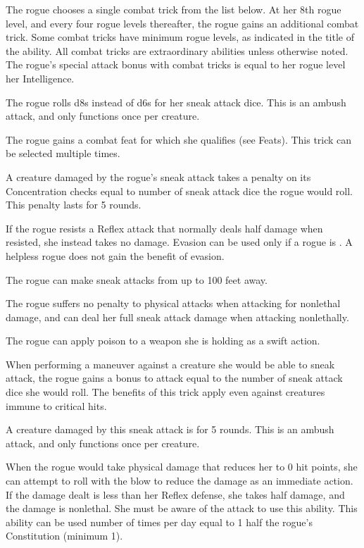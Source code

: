 The rogue chooses a single combat trick from the list below. At her 8th rogue level, and every four rogue levels thereafter, the rogue gains an additional combat trick. Some combat tricks have minimum rogue levels, as indicated in the title of the ability. All combat tricks are extraordinary abilities unless otherwise noted. The rogue's special attack bonus with combat tricks is equal to her rogue level \add her Intelligence.

 The rogue rolls d8s instead of d6s for her sneak attack dice. This is an ambush attack, and only functions once per creature.

 The rogue gains a combat feat for which she qualifies (see Feats). This trick can be selected multiple times.

 A creature damaged by the rogue's sneak attack takes a penalty on its Concentration checks equal to number of sneak attack dice the rogue would roll. This penalty lasts for 5 rounds.

 If the rogue resists a Reflex attack that normally deals half damage when resisted, she instead takes no damage. Evasion can be used only if a rogue is \unencumbered. A helpless rogue does not gain the benefit of evasion.

 The rogue can make sneak attacks from up to 100 feet away.

 The rogue suffers no penalty to physical attacks when attacking for nonlethal damage, and can deal her full sneak attack damage when attacking nonlethally.

 The rogue can apply poison to a weapon she is holding as a swift action.

 When performing a maneuver against a creature she would be able to sneak attack, the rogue gains a bonus to attack equal to the number of sneak attack dice she would roll. The benefits of this trick apply even against creatures immune to critical hits.

 A creature damaged by this sneak attack is \bewildered for 5 rounds. This is an ambush attack, and only functions once per creature.

 When the rogue would take physical damage that reduces her to 0 hit points, she can attempt to roll with the blow to reduce the damage as an immediate action. If the damage dealt is less than her Reflex defense, she takes half damage, and the damage is nonlethal. She must be aware of the attack to use this ability. This ability can be used number of times per day equal to 1 \add half the rogue's Constitution (minimum 1).

